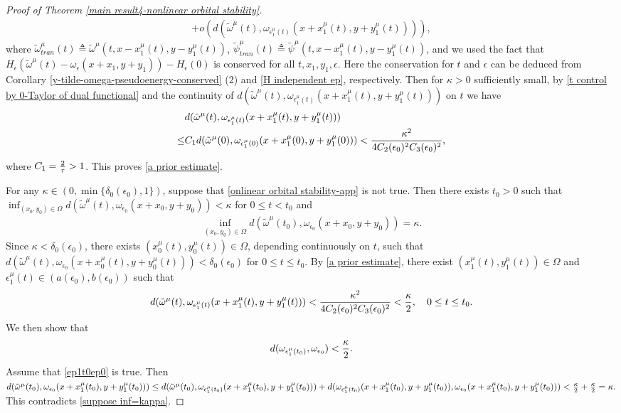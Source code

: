 \documentclass[1 [leqno, 11pt]{amsart}
\numberwithin{equation}{section}
\let\ep=\epsilon
\begin{document}
\begin{CJK*}{GBK}{song}
\begin{proof}[Proof of  Theorem \ref{main result4-nonlinear orbital stability}]
\begin{align}
+o(d(\tilde \omega^\mu(t),\omega_{\ep_1^\mu(t)}(x+x_1^\mu(t),y+y_1^\mu(t)))),
\end{align}
where $\tilde \omega_{tran}^\mu(t)\triangleq\tilde \omega^\mu(t,x-x_1^\mu(t),y-y_1^\mu(t))$, $\tilde \psi_{tran}^\mu(t)\triangleq\tilde \psi^\mu(t,x-x_1^\mu(t),y-y_1^\mu(t))$, and we used the fact that $H_{\ep}(\tilde \omega^\mu(t)-\omega_{\ep}(x+x_1,y+y_1)) - H_{\ep}(0)$ is conserved for all $t, x_1, y_1, \ep$. Here the conservation for $t$ and $\ep$ can be deduced from Corollary \ref{y-tilde-omega-pseudoenergy-conserved} (2) and \eqref{H independent ep}, respectively. Then for $\kappa>0$ sufficiently small, by \eqref{t control by 0-Taylor of dual functional} and the continuity of $d(\tilde \omega^\mu(t),\omega_{\ep_1^\mu(t)}(x+x_1^\mu(t),y+y_1^\mu(t)))$ on $t$ we have
\begin{align}\nonumber
&d(\tilde \omega^\mu(t),\omega_{\ep_1^\mu(t)}(x+x_1^\mu(t),y+y_1^\mu(t)))\\\label{de-c1}
\leq& C_1 d(\tilde \omega^\mu(0),\omega_{\ep_1^\mu(0)}(x+x_1^\mu(0),y+y_1^\mu(0)))< {\kappa^2\over4C_2(\ep_0)^2C_3(\ep_0)^2},
\end{align}
where  $C_1={2\over\tau}>1$. This proves \eqref{a prior estimate}.

For any $\kappa\in(0,\min\{\delta_0(\ep_0), 1\})$, suppose that \eqref{onlinear orbital stability-app} is not true. Then there exists  $t_0>0$ such that $\inf_{(x_0,y_0)\in\Omega}d(\tilde \omega^\mu(t),\omega_{\ep_0}(x+x_0,y+y_0))<\kappa$ for $0\leq t<t_0$ and
\begin{align}\label{suppose inf=kappa}
\inf_{(x_0,y_0)\in\Omega}d(\tilde \omega^\mu(t_0),\omega_{\ep_0}(x+x_0,y+y_0))=\kappa.
\end{align}
Since $\kappa<\delta_0(\ep_0)$, there exists $( x_0^\mu(t),y_0^\mu(t))\in\Omega$, depending continuously on $t$, such that $ d(\tilde \omega^\mu(t),\omega_{\ep_0}(x+x_0^\mu(t),y+y_0^\mu(t)))<\delta_0(\ep_0)$ for $0\leq t\leq t_0$.
 By \eqref{a prior estimate},
 there exist $(x_1^\mu(t),y_1^\mu(t))\in\Omega$ and $\ep_1^\mu(t)\in(a(\ep_0),b(\ep_0))$ such that
\begin{align}\label{d-t0-ep1}
d(\tilde \omega^\mu(t),\omega_{\ep_1^\mu(t)}(x+x_1^\mu(t),y+y_1^\mu(t)))<{\kappa^2\over4C_2(\ep_0)^2C_3(\ep_0)^2}<{\kappa\over2},\quad 0\leq t\leq t_0.
\end{align}
We then show that
\begin{align}\label{ep1t0ep0}
d(\omega_{\ep_1^\mu(t_0)},\omega_{\ep_0})<{\kappa\over 2}.
\end{align}
Assume that \eqref{ep1t0ep0} is true. Then
$
d(\tilde \omega^\mu(t_0),\omega_{\ep_0}(x+x_1^\mu(t_0),y+y_1^\mu(t_0)))\leq d(\tilde \omega^\mu(t_0),\omega_{\ep_1^\mu(t_0)}(x+x_1^\mu(t_0),y+y_1^\mu(t_0)))+d(\omega_{\ep_1^\mu(t_0)}(x+x_1^\mu(t_0),y+y_1^\mu(t_0)),\omega_{\ep_0}(x+x_1^\mu(t_0),y+y_1^\mu(t_0))) <{\kappa\over2}+{\kappa\over2}=\kappa.
$
This contradicts \eqref{suppose inf=kappa}.


\end{proof}
\end{CJK*}
\end{document}

